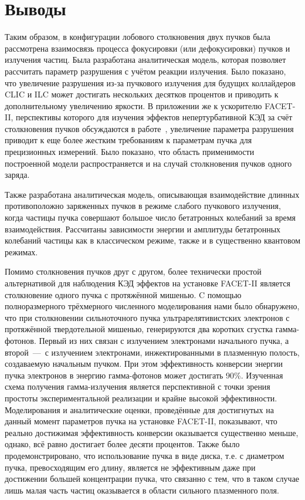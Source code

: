 \section{Выводы}

Таким образом, в конфигурации лобового столкновения двух пучков была рассмотрена взаимосвязь процесса фокусировки (или дефокусировки) пучков и излучения частиц.
Была разработана аналитическая модель, которая позволяет рассчитать параметр разрушения с учётом реакции излучения.
Было показано, что увеличение разрушения из-за пучкового излучения для будущих коллайдеров CLIC и ILC может достигать нескольких десятков процентов и приводить к дополнительному увеличению яркости.
В приложении же к ускорителю FACET-II, перспективы которого для изучения эффектов непертурбативной КЭД за счёт столкновения пучков обсуждаются в работе~\cite{yakimenko2019prospect}, увеличение параметра разрушения приводит к еще более жестким требованиям к параметрам пучка для прецизионных измерений.
Было показано, что область применимости построенной модели распространяется и на случай столкновения пучков одного заряда.

Также разработана аналитическая модель, описывающая взаимодействие длинных противоположно заряженных пучков в режиме слабого пучкового излучения, когда частицы пучка совершают большое число бетатронных колебаний за время взаимодействия.
Рассчитаны зависимости энергии и амплитуды бетатронных колебаний частицы как в классическом режиме, также и в существенно квантовом режимах.

Помимо столкновения пучков друг с другом, более технически простой альтернативой для наблюдения КЭД эффектов на установке FACET-II является столкновение одного пучка с протяжённой мишенью.
C помощью полноразмерного трёхмерного численного моделирования нами было обнаружено, что при столкновении сильноточного пучка ультрарелятивистских электронов с протяжённой твердотельной мишенью, генерируются два коротких сгустка гамма-фотонов.
Первый из них связан с излучением электронами начального пучка, а второй~---~с излучением электронами, инжектированными в плазменную полость, создаваемую начальным пучком.
При этом эффективность конверсии энергии пучка электронов в энергию гамма-фотонов может достигать 90\%.
Изученная схема получения гамма-излучения является перспективной с точки зрения простоты экспериментальной реализации и крайне высокой эффективности.
Моделирования и аналитические оценки, проведённые для достигнутых на данный момент параметров пучка на установке FACET-II, показывают, что реально достижимая эффективность конверсии оказывается существенно меньше, однако, всё равно достигает более десяти процентов.
Также было продемонстрировано, что использование пучка в виде диска, т.е. с диаметром пучка, превосходящим его длину, является не эффективным даже при достижении большей концентрации пучка, что связанно с тем, что в таком случае лишь малая часть частиц оказывается в области сильного плазменного поля.

